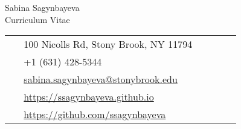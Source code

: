 \documentclass[10pt]{article} %
\begin{document}
\begin{paracol}{2}

\parbox[top][0.12\textheight][c]{\linewidth}{ %
	\vspace{-0.04\textheight} %
	\centering %
	{\sffamily\Huge Sabina Sagynbayeva}\\\medskip %
	{\Huge\color{headings}\cvtextfont Curriculum Vitae}
}
\switchcolumn %

\parbox[top][0.12\textheight][c]{\linewidth}{ %
	\vspace{-0.04\textheight} %
	\colorbox{shade}{ %
		\begin{supertabular}{p{0.05\linewidth}|p{0.775\linewidth}} %
			\raisebox{-1pt}{\faHome} & 100 Nicolls Rd, Stony Brook, NY 11794 \\ %
			\raisebox{-1pt}{\faPhone} & +1 (631) 428-5344 \\ %
			\raisebox{0pt}{\small\faEnvelope} & \href{mailto:sabina.sagynbayeva@stonybrook.edu}{sabina.sagynbayeva@stonybrook.edu} \\ %
			\raisebox{-1pt}{\small\faDesktop} & \href{https://ssagynbayeva.github.io}{https://ssagynbayeva.github.io} \\ %
			\raisebox{-1pt}{\faGithub} & \href{https://github.com/ssagynbayeva}{https://github.com/ssagynbayeva} \\ %
		\end{supertabular}
	}
}
\end{paracol}
\end{document}
